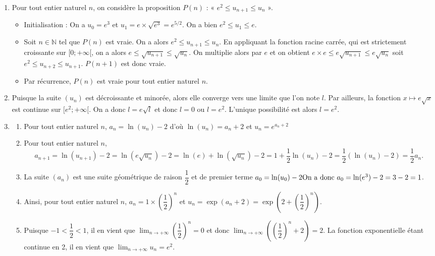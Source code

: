 \documentclass[11pt,fleqn, openany]{book} %
\begin{document}
\begin{solution}\hspace{0pt}


\begin{enumerate}
\item Pour tout entier naturel \(n\), on considère la proposition \(P(n)\) : « \(e^2 \leqslant u_{n+1} \leqslant u_n\) ».
	\begin{itemize}
	\item Initialisation : On a \(u_0=e^3\) et \(u_1=e \times \sqrt{e^3}=e^{5/2}\). On a bien \(e^2 \leqslant u_1 \leqslant e\).
		\item Soit \(n\in\mathbb{N}\) tel que \(P(n)\) est vraie. On a alors \(e^2 \leqslant u_{n+1} \leqslant u_n\). En appliquant la fonction racine carrée, qui est strictement croissante sur \([0;+\infty [\), on a alors \(e \leqslant \sqrt{u_{n+1}} \leqslant \sqrt{u_n}\). On multiplie alors par \(e\) et on obtient \(e \times e\leqslant e\sqrt{u_{n+1}} \leqslant e\sqrt{u_n}\) soit \(e^2 \leqslant u_{n+2} \leqslant u_{n+1}\). \(P(n+1)\) est donc vraie.
		\item Par récurrence, \(P(n)\) est vraie pour tout entier naturel \(n\).
		\end{itemize}
		\item Puisque la suite \((u_n)\) est décroissante et minorée, alors elle converge vers une limite que l'on note \(l\). Par ailleurs, la fonction \(x\mapsto e\sqrt{x}\) est continue sur \([e^2;+\infty[\). On a donc \(l=e\sqrt{l}\) et donc \(l=0\) ou \(l=e^2\). L'unique possibilité est alors \(l=e^2\).
		\item \begin{enumerate}\item Pour tout entier naturel \(n\), \(a_n=\ln (u_n)-2\) d'où \(\ln(u_n)=a_n+2\) et \(u_n=e^{a_n+2}\)
			\item Pour tout entier naturel \(n\),
\[a_{n+1}=\ln(u_{n+1})-2=\ln(e\sqrt{u_n})-2=\ln(e)+\ln(\sqrt{u_n})-2=1+\dfrac{1}{2}\ln(u_n)-2=\dfrac{1}{2}(\ln(u_n)-2)=\dfrac{1}{2}a_n.\]
			\item La suite \((a_n)\) est une suite géométrique de raison \(\dfrac{1}{2}\) et de premier terme \(a_0=\ln(u_0)-2$ \\ On a donc \(a_0=\ln(e^3)-2=3-2=1\).
			\item Ainsi, pour tout entier naturel \(n\), \(a_n=1 \times \left(\dfrac{1}{2}\right)^n\) et \(u_n=\exp(a_n+2)=\exp \left(2 + \left(\dfrac{1}{2}\right)^n\right)\).
			\item Puisque \(-1 < \dfrac{1}{2} < 1\), il en vient que \(\displaystyle\lim_{n\to +\infty}\left(\dfrac{1}{2}\right)^n=0\) et donc \(\displaystyle\lim_{n\to +\infty}\left(\left(\dfrac{1}{2}\right)^n+2\right)=2\). La fonction exponentielle étant continue en 2, il en vient que \(\displaystyle\lim_{n\to +\infty}u_n=e^2\).\end{enumerate}\end{enumerate}

\end{solution}
\end{document}
